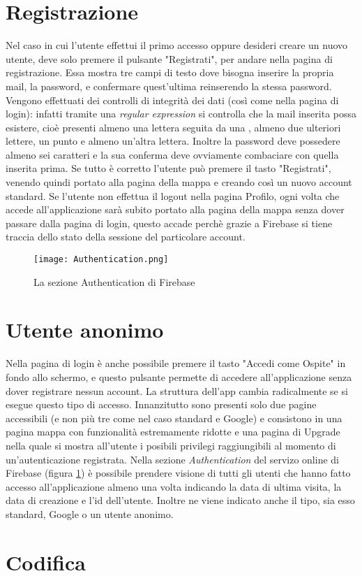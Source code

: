 \section{Registrazione}
Nel caso in cui l'utente effettui il primo accesso oppure desideri creare un
nuovo utente, deve solo premere il pulsante "Registrati", per andare nella
pagina di registrazione. Essa mostra tre campi di testo dove bisogna inserire la
propria mail, la password, e confermare quest'ultima reinserendo la stessa
password. Vengono effettuati dei controlli di integrità dei dati (così come
nella pagina di login): infatti tramite una \textit{regular expression} si
controlla che la mail inserita possa esistere, cioè presenti almeno una
lettera seguita da una \MVAt, almeno due ulteriori lettere, un punto e almeno un'altra
lettera. Inoltre la password deve possedere almeno sei caratteri e la sua
conferma deve ovviamente combaciare con quella inserita prima. Se tutto è
corretto l'utente può premere il tasto "Registrati", venendo quindi portato alla
pagina della mappa e creando così un nuovo account standard. \newline
Se l'utente non effettua il logout nella pagina Profilo, ogni volta che accede
all'applicazione sarà subito portato alla pagina della mappa senza dover passare
dalla pagina di login, questo accade perchè grazie a Firebase si tiene traccia
dello stato della sessione del particolare account.

\begin{figure}[h!]
    \centering
    \texttt{[image: Authentication.png]}
    \caption{La sezione Authentication di Firebase}
    \label{authentication}
\end{figure}

\section{Utente anonimo}
Nella pagina di login è anche possibile premere il tasto "Accedi come Ospite" in
fondo allo schermo, e questo pulsante permette di accedere all'applicazione
senza dover registrare nessun account. La struttura dell'app cambia radicalmente
se si esegue questo tipo di accesso. Innanzitutto sono presenti solo due pagine
accessibili (e non più tre come nel caso standard e Google) e consistono in una
pagina mappa con funzionalità estremamente ridotte e una pagina di Upgrade nella
quale si mostra all'utente i posibili privilegi raggiungibili al momento di
un'autenticazione registrata. Nella sezione \textit{Authentication} del servizo
online di Firebase (figura \ref{authentication}) è possibile prendere visione di tutti gli utenti che hanno
fatto accesso all'applicazione almeno una volta indicando la data di ultima
visita, la data di creazione e l'id dell'utente. Inoltre ne viene indicato anche
il tipo, sia esso standard, Google o un utente anonimo.

\section{Codifica}
